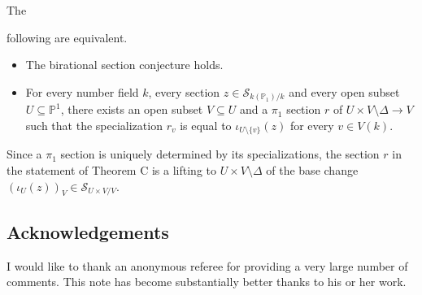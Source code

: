 \documentclass[11pt]{amsart}
\theoremstyle{plain}
\theoremstyle{definition}
\newcommand{\on}{\operatorname}
\newcommand{\1}{\mathbb{1}}
\newcommand{\gal}{\on{Gal}}
\newcommand{\mc}{\mathcal}
\newcommand{\s}{\subseteq}
\renewcommand{\P}{\mathbb{P}}
\begin{document}

\begin{TC}
	\hypertarget{TC}{The} following are equivalent.
	\begin{itemize}
		\item The birational section conjecture holds.
		\item For every number field $k$, every section $z\in\mc{S}_{k(\P_{1})/k}$ and every open subset $U\s\P^{1}$, there exists an open subset $V\s U$ and a $\pi_{1}$ section $r$ of $U\times V\setminus\Delta \to V$ such that the specialization $r_{v}$ is equal to $\iota_{U\setminus\{v\}}(z)$ for every $v\in V(k)$.
	\end{itemize}
\end{TC}

Since a $\pi_{1}$ section is uniquely determined by its specializations, the section $r$ in the statement of Theorem C is a lifting to $U\times V \setminus \Delta$ of the base change $(\iota_{U}(z))_{V}\in\mc{S}_{U\times V/V}$.



\subsection*{Acknowledgements}

I would like to thank an anonymous referee for providing a very large number of comments. This note has become substantially better thanks to his or her work.
\end{document}
